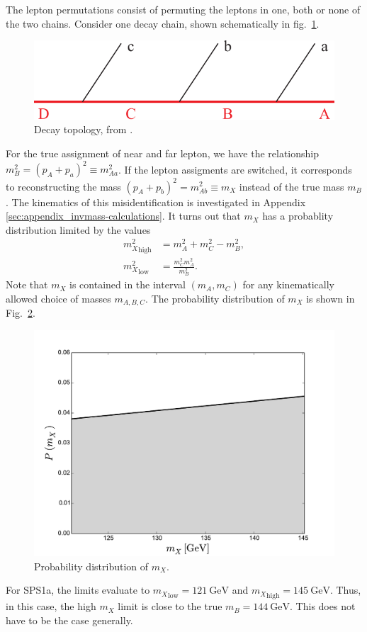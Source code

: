 \documentclass[twoside,english]{uiofysmaster}
\begin{document}
The lepton permutations consist of permuting the leptons in one, both or none of the two chains. Consider one decay chain, shown schematically in fig.\ \ref{fig:decaytree_improvementchap}.
\begin{figure}[hbt]
\centering
\includegraphics[scale=0.7]{figures/fig-chain.pdf} %
\caption{Decay topology, from \cite{Miller:2005zp}.}
\label{fig:decaytree_improvementchap}
\end{figure} 
For the true assignment of near and far lepton, we have the relationship $m^2_B = (p_A + p_a)^2 \equiv m^2_{Aa}$. If the lepton assigments are switched, it corresponds to reconstructing the mass $(p_A + p_b)^2 = m^2_{Ab} \equiv m_X$ instead of the true mass $m_B$. The kinematics of this misidentification is investigated in Appendix \ref{sec:appendix_invmass-calculations}. It turns out that $m_X$ has a probablity distribution limited by the values 
\begin{align}
	{m_X^2}_\mathrm{high} &= m_A^2 + m_C^2 - m_B^2,\\
	{m_X^2}_\mathrm{low} &= \frac{m_C^2 m_A^2}{m_B^2}.\nonumber
\end{align}
Note that $m_X$ is contained in the interval $(m_A, m_C)$ for any kinematically allowed choice of masses $m_{A,B,C}.$ The probability distribution of $m_X$ is shown in Fig.\ \ref{fig:mX-dist_improvementchap}.
\begin{figure}[hbt]
\centering
\includegraphics[scale=0.4]{figures/appendix/mX-distribution.pdf}
\caption{Probability distribution of $m_X$.}
\label{fig:mX-dist_improvementchap}
\end{figure}
For SPS1a, the limits evaluate to ${m_X}_\mathrm{low} = 121~\mathrm{GeV}$ and ${m_X}_\mathrm{high} = 145 ~\mathrm{GeV}$. Thus, in this case, the high $m_X$ limit is close to the true $m_B = 144 ~\mathrm{GeV}$. This does not have to be the case generally. 
\end{document}
